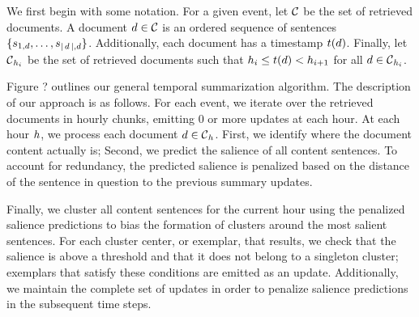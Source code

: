 
We first begin with some notation. For a given event, let $\corpus$ be the set
of retrieved documents. A document $\doc \in \corpus$ is an ordered sequence
of sentences $\{\sent_{1,\doc},\ldots,\sent_{|\doc|,\doc} \}$. 
Additionally, each document has a timestamp $\dtime(\doc)$. Finally, let 
$\corpus_{\hour_i}$ be the set of retrieved documents such that 
$\hour_i \le \dtime(\doc) < \hour_{i+1}$ for all $\doc \in \corpus_{\hour_i}$.

Figure ? outlines our general temporal summarization algorithm. The description
of our approach is as follows.
For each event, we iterate over the retrieved 
documents in hourly chunks, emitting 0 or more updates at each hour.
At each hour $\hour$, we process each document
$\doc \in \corpus_{\hour}$. First, we identify where the document content
actually is; Second, we predict the salience of all content sentences.
To account for redundancy, the predicted salience is penalized based on the 
distance of the sentence in question to the previous summary updates.

Finally, we cluster all content sentences 
for the current hour using the penalized salience predictions to bias the 
formation
of clusters around the most salient sentences. For each cluster center, or 
exemplar, that results, we check that the salience is above a threshold and 
that it does not belong to a singleton cluster; exemplars that satisfy these
conditions are emitted as an update.
Additionally, we maintain the complete set of updates in order to penalize
salience predictions in the subsequent time steps. 

